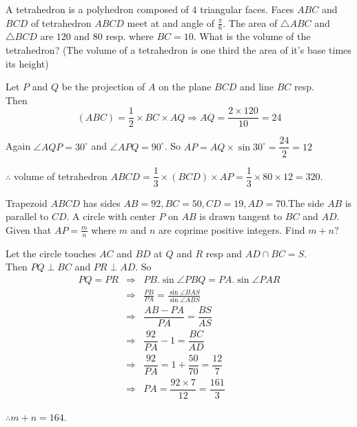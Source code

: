 \documentclass{subfile}
\begin{document}
		\begin{problem}
			A tetrahedron is a polyhedron composed of $4$ triangular faces. Faces $ABC$ and $BCD$ of tetrahedron $ABCD$ meet at and angle of $\frac{\pi}{6}$. The area of $\triangle ABC$ and $\triangle BCD$ are $120$ and $80$ resp. where $BC=10$. What is the volume of the tetrahedron? (The volume of a tetrahedron is one third the area of it's base times its height)
		\end{problem}
		\begin{solution} Let $P$ and $Q$ be the projection of $A$ on the plane $BCD$ and line $BC$ resp.\\

			Then $$(ABC)=\dfrac{1}{2}\times BC\times AQ \Longrightarrow AQ=\dfrac{2\times 120}{10}=24$$

			Again $\angle AQP=30^{\circ}$ and $\angle APQ=90^{\circ}$. So $AP=AQ\times \sin 30^{\circ}=\dfrac{24}{2}=12$

			$\therefore$ volume of tetrahedron $ABCD=\dfrac{1}{3}\times (BCD)\times AP=\dfrac{1}{3}\times 80 \times 12=320$.

		\end{solution}

		\begin{problem}
			Trapezoid $ABCD$ has sides $AB=92,BC=50,CD=19,AD=70$.The side $AB$ is parallel to $CD$. A circle with center $P$ on $AB$ is drawn tangent to $BC$ and $AD$. Given that $AP=\frac{m}{n}$ where $m$ and $n$ are coprime positive integers. Find $m+n$?
		\end{problem}

		\begin{solution} Let the circle touches $AC$ and $BD$ at $Q$ and $R$ resp and $AD\cap BC=S$.\\
			Then $PQ\perp BC$ and $PR\perp AD$.
			So
		\begin{eqnarray*}
			PQ=PR
			& \Longrightarrow & PB.\sin \angle PBQ=PA.\sin \angle PAR\\
			& \Longrightarrow & \frac{PB}{PA}=\frac{\sin \angle BAS}{\sin \angle ABS}\\
			& \Longrightarrow & \dfrac{AB-PA}{PA}=\dfrac{BS}{AS}\\
			& \Longrightarrow & \dfrac{92}{PA}-1=\dfrac{BC}{AD}\\
			& \Longrightarrow & \dfrac{92}{PA}=1+\dfrac{50}{70}=\dfrac{12}{7}\\
			& \Longrightarrow & PA=\dfrac{92\times 7}{12}=\dfrac{161}{3}
		\end{eqnarray*}

			$\therefore m+n=164$.

		\end{solution}
\end{document}
